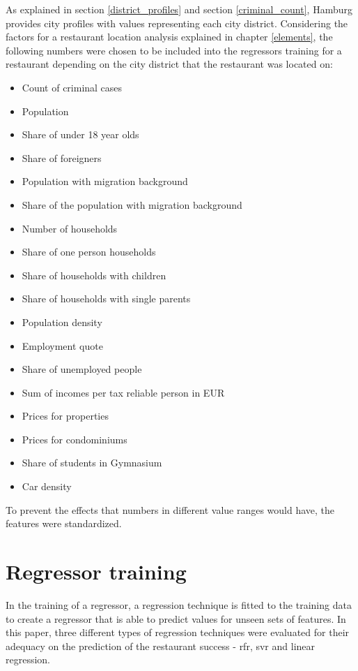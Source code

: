 \documentclass[a4paper, 11pt, oneside]{Thesis}  %
\begin{document}
As explained in section \ref{district_profiles} and section \ref{criminal_count}, Hamburg provides city profiles with values representing each city district. Considering the factors for a restaurant location analysis explained in chapter \ref{elements}, the following numbers were chosen to be included into the regressors training for a restaurant depending on the city district that the restaurant was located on:
\begin{itemize}
\item Count of criminal cases
\item Population
\item Share of under 18 year olds
\item Share of foreigners
\item Population with migration background
\item Share of the population with migration background
\item Number of households
\item Share of one person households
\item Share of households with children
\item Share of households with single parents
\item Population density
\item Employment quote
\item Share of unemployed people
\item Sum of incomes per tax reliable person in EUR
\item Prices for properties
\item Prices for condominiums
\item Share of students in Gymnasium
\item Car density
\end{itemize}


To prevent the effects that numbers in different value ranges would have, the features were standardized.

\section{Regressor training}

In the training of a regressor, a regression technique is fitted to the training data to create a regressor that is able to predict values for unseen sets of features. In this paper, three different types of regression techniques were evaluated for their adequacy on the prediction of the restaurant success - \ac{rfr}, \ac{svr} and linear regression.
\end{document}
